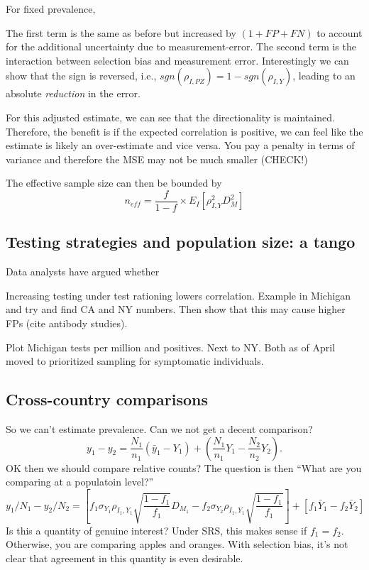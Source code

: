 \documentclass[11pt]{article}
\numberwithin{equation}{section}
\theoremstyle{plain}
\begin{document}
For fixed prevalence,


The first term is the same as before but increased by $(1 + FP + FN)$ to account for the additional uncertainty due to measurement-error.  The second term is the interaction between selection bias and measurement error.  Interestingly we can show that the sign is reversed, i.e., $sgn(\rho_{I,PZ}) = 1 - sgn(\rho_{I,Y})$, leading to an absolute \emph{reduction} in the error.

For this adjusted estimate, we can see that the directionality is maintained.  Therefore, the benefit is if the expected correlation is positive, we can feel like the estimate is likely an over-estimate and vice versa.  You pay a penalty in terms of variance and therefore the MSE may not be much smaller (CHECK!)

The effective sample size can then be bounded by
$$
n_{eff} = \frac{f}{1-f} \times E_{I} \left[ \rho_{I,Y}^2 D_M^2 \right]
$$

\subsection{Testing strategies and population size: a tango}

Data analysts have argued whether

Increasing testing under test rationing lowers correlation.  Example in Michigan and try and find CA and NY numbers.  Then show that this may cause higher FPs (cite antibody studies).

Plot Michigan tests per million and positives.  Next to NY.  Both as of April moved to prioritized sampling for symptomatic individuals.

\subsection{Cross-country comparisons}

So we can't estimate prevalence.  Can we not get a decent comparison?
$$
y_1 - y_2 = \frac{N_1}{n_1} ( \bar y_1 - Y_{1}) + \left( \frac{N_1}{n_1} Y_{1} - \frac{N_2}{n_2} Y_2  \right).
$$
OK then we should compare relative counts?
The question is then ``What are you comparing at a populatoin level?''
$$
y_1/N_1 - y_2/ N_2 = \left[ f_1 \sigma_{Y_1} \rho_{I_1, Y_1} \sqrt{\frac{1-f_1}{f_1}} D_{M_1} - f_2 \sigma_{Y_2} \rho_{I_1, Y_1} \sqrt{\frac{1-f_1}{f_1}}  \right] + \left[ f_1 \bar Y_1 - f_2 \bar Y_2 \right]
$$
Is this a quantity of genuine interest? Under SRS, this makes sense if $f_1 = f_2$.  Otherwise, you are comparing apples and oranges.  With selection bias, it's not clear that agreement in this quantity is even desirable.
\end{document}
